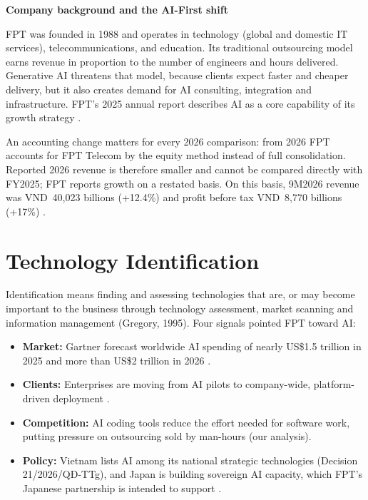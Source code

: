 \documentclass[a4paper,12pt]{report}
\begin{document}
\vspace{0.3cm}
\noindent\textbf{Company background and the AI-First shift}\par
\vspace{0.3cm}
FPT was founded in 1988 and operates in technology (global and domestic IT services), telecommunications, and education. 
Its traditional outsourcing model earns revenue in proportion to the number of engineers and hours delivered. 
Generative AI threatens that model, because clients expect faster and cheaper delivery, but it also creates demand for 
AI consulting, integration and infrastructure. FPT's 2025 annual report describes AI as a core capability of its growth 
strategy \cite{S16}.

An accounting change matters for every 2026 comparison: from 2026 FPT accounts for FPT Telecom by the equity method instead 
of full consolidation. Reported 2026 revenue is therefore smaller and cannot be compared directly with FY2025; FPT reports 
growth on a restated basis. On this basis, 9M2026 revenue was VND~40,023 billions (+12.4\%) and profit before tax VND~8,770 billions (+17\%) 
\cite{S2}.


\chapter{Technology Identification}

Identification means finding and assessing technologies that are, or may become important to the business through 
technology assessment, market scanning and information management (Gregory, 1995). Four signals pointed FPT toward AI:

\begin{itemize}
  \item \textbf{Market:} Gartner forecast worldwide AI spending of nearly US\$1.5 trillion in 2025 and more than US\$2 trillion 
  in 2026 \cite{S1}.
  \item \textbf{Clients:} Enterprises are moving from AI pilots to company-wide, platform-driven deployment \cite{S17}.
  \item \textbf{Competition:} AI coding tools reduce the effort needed for software work, putting pressure on outsourcing 
  sold by man-hours (our analysis).
  \item \textbf{Policy:} Vietnam lists AI among its national strategic technologies (Decision 21/2026/QĐ-TTg), and Japan 
  is building sovereign AI capacity, which FPT's Japanese partnership is intended to support \cite{S6}.
\end{itemize}
\end{document}
